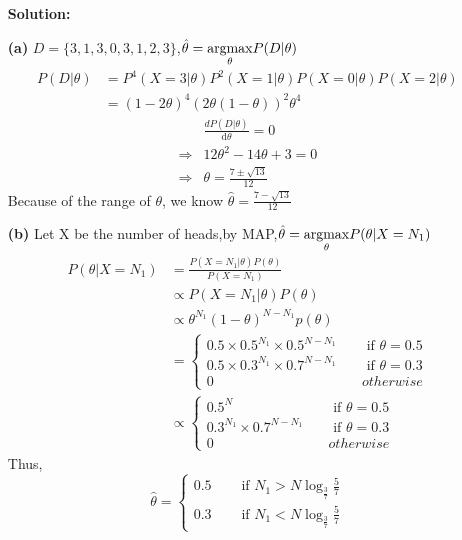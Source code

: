 \documentclass[10pt]{article}
\begin{document}
\begin{enumerate}
    \textbf{Solution:}
    \item[\textbf{(a)}]
      $D=\{3,1,3,0,3,1,2,3\}$,$\hat{\theta} = \underset{\theta}{\argmax}P(D|\theta)$
      $$
      \begin{aligned}
        P(D|\theta)&=P^4(X=3|\theta)P^2(X=1|\theta)P(X=0|\theta)P(X=2|\theta)
        \\&=(1-2\theta)^4(2\theta(1-\theta))^2\theta^4
      \end{aligned}
      $$
      $$
      \begin{aligned}
        &\frac{d P(D|\theta)}{\mathrm{d}\theta}=0
        \\ \Rightarrow &12\theta^2-14\theta+3=0
        \\ \Rightarrow &\theta = \frac{7 \pm \sqrt{13}}{12}
      \end{aligned}
      $$
      Because of the range of $\theta$, we know $\hat{\theta} = \frac{7 - \sqrt{13}}{12}$
    \item[\textbf{(b)}]
      Let X be the number of heads,by MAP,$\hat{\theta} = \underset{\theta}{\argmax}P(\theta|X=N_1)$
      $$
      \begin{aligned}
        P(\theta |X = N_1) &=\frac{P(X=N_1|\theta)P(\theta)}{P(X=N_1)}
        \\&\varpropto P(X=N_1|\theta)P(\theta)
        \\&\varpropto \theta^{N_1}(1-\theta)^{N-N_1}p(\theta)
        \\&=\begin{cases}
          0.5 \times 0.5^{N_1}\times 0.5 ^{N-N_1}  \quad& \text { if } \theta=0.5  
          \\0.5 \times 0.3^{N_1}\times 0.7 ^{N-N_1}  \quad& \text { if } \theta=0.3
          \\0 &  otherwise
        \end{cases}
        \\&\varpropto \begin{cases}
           0.5^{N}  \quad& \text { if } \theta=0.5  
          \\0.3^{N_1}\times 0.7 ^{N-N_1} \quad& \text { if } \theta=0.3
          \\0 &  otherwise
        \end{cases}
      \end{aligned}
      $$
      Thus,
      $$\hat{\theta} = \begin{cases}
        0.5 \quad& \text { if } N_1>N\log_{\frac{3}{7}}\frac{5}{7}
          \\0.3 \quad& \text { if } N_1<N\log_{\frac{3}{7}}\frac{5}{7}

\end{cases}$$
\end{enumerate}
\end{document}
